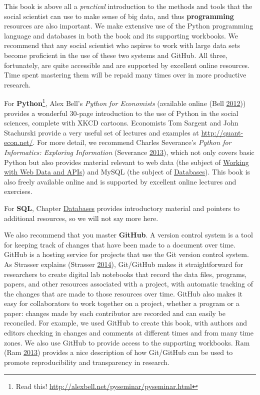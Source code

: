 \documentclass[]{krantz}
\begin{document}
This book is above all a \emph{practical} introduction to the methods
and tools that the social scientist can use to make sense of big data,
and thus \textbf{programming} resources are also important. We make
extensive use of the Python programming language and databases in both
the book and its supporting workbooks. We recommend that any social
scientist who aspires to work with large data sets become proficient in
the use of these two systems and GitHub. All three, fortunately, are
quite accessible and are supported by excellent online resources. Time
spent mastering them will be repaid many times over in more productive
research.

For \textbf{Python}\footnote{Read this!
  \url{http://alexbell.net/pyseminar/pyseminar.html}}, Alex Bell's
\emph{Python for Economists} (available online (Bell
\protect\hyperlink{ref-BellPython}{2012})) provides a wonderful 30-page
introduction to the use of Python in the social sciences, complete with
XKCD cartoons. Economists Tom Sargent and John Stachurski provide a very
useful set of lectures and examples at \url{http://quant-econ.net/}. For
more detail, we recommend Charles Severance's \emph{Python for
Informatics: Exploring Information} (Severance
\protect\hyperlink{ref-SeverancePython}{2013}), which not only covers
basic Python but also provides material relevant to web data (the
subject of \protect\hyperlink{chap:web}{Working with Web Data and APIs})
and MySQL (the subject of \protect\hyperlink{chap:db}{Databases}). This
book is also freely available online and is supported by excellent
online lectures and exercises.

For \textbf{SQL}, Chapter \protect\hyperlink{chap:db}{Databases}
provides introductory material and pointers to additional resources, so
we will not say more here.

We also recommend that you master \textbf{GitHub}. A version control
system is a tool for keeping track of changes that have been made to a
document over time. GitHub is a hosting service for projects that use
the Git version control system. As Strasser explains (Strasser
\protect\hyperlink{ref-GitResearch}{2014}), Git/GitHub makes it
straightforward for researchers to create digital lab notebooks that
record the data files, programs, papers, and other resources associated
with a project, with automatic tracking of the changes that are made to
those resources over time. GitHub also makes it easy for collaborators
to work together on a project, whether a program or a paper: changes
made by each contributor are recorded and can easily be reconciled. For
example, we used GitHub to create this book, with authors and editors
checking in changes and comments at different times and from many time
zones. We also use GitHub to provide access to the supporting workbooks.
Ram (Ram \protect\hyperlink{ref-ram2013git}{2013}) provides a nice
description of how Git/GitHub can be used to promote reproducibility and
transparency in research.
\end{document}
